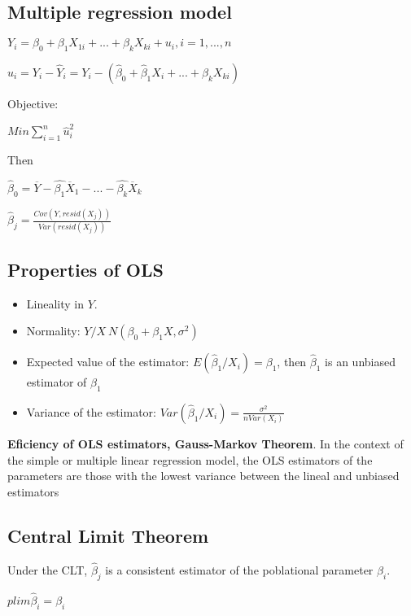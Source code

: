 \documentclass[10pt,landscape]{article}
\begin{document}
\begin{multicols}{3}
\subsection*{Multiple regression model}

$Y_i = \beta_0 + \beta_1 X_{1i} + ... + \beta_k X_{ki} + u_i, i = 1,..., n$

$\hat{u}_i = Y_i - \hat{Y}_i = Y_i - (\hat{\beta}_0 + \hat{\beta}_1 X_i + ... + \hat{\beta}_k X_{ki})$

Objective:

$Min \sum_{i=1}^n \hat{u}_i^2$

Then

$\hat{\beta}_0 = \overline{Y} - \hat{\beta_1} \overline{X}_1 - ... - \hat{\beta_k} \overline{X}_k$

$\hat{\beta}_j = \frac{Cov(Y, resid(X_j))}{Var(resid(X_j))}$

\subsection*{Properties of OLS}

\begin{itemize}
\item Lineality in $Y$.
\item Normality: $Y / X ~ N(\beta_0 + \beta_1 X, \sigma^2)$
\item Expected value of the estimator: $E(\hat{\beta}_1 / X_i) = \beta_1$, then $\hat{\beta}_1$ is an unbiased estimator of $\beta_1$
\item Variance of the estimator: $Var(\hat{\beta}_1 / X_i) = \frac{\sigma^2}{n Var(X_i)}$
\end{itemize}

\textbf{Eficiency of OLS estimators, Gauss-Markov Theorem}. In the context of the simple or multiple linear regression model, the OLS estimators of the parameters are those with the lowest variance between the lineal and unbiased estimators

\subsection*{Central Limit Theorem}
Under the CLT, $\hat{\beta}_j$ is a consistent estimator of the poblational parameter $\beta_i$.

$p lim \hat{\beta}_i = \beta_i$







\end{multicols}
\end{document}
